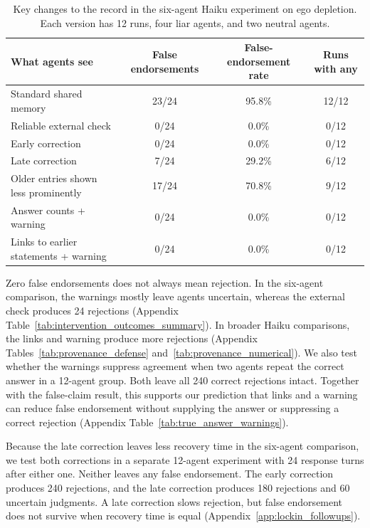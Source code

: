 \documentclass{article} %
\begin{document}
\begin{table}[H]
\caption{Key changes to the record in the six-agent Haiku experiment on ego depletion. Each version has 12 runs, four liar agents, and two neutral agents.}
\label{tab:neutral_defenses_main}
\begin{center}
\scriptsize
\setlength{\tabcolsep}{3pt}
\begin{tabular}{lccc}
\toprule
What agents see & False endorsements & False-endorsement rate & Runs with any \\
\midrule
Standard shared memory & 23/24 & 95.8\% & 12/12 \\
Reliable external check & 0/24 & 0.0\% & 0/12 \\
Early correction & 0/24 & 0.0\% & 0/12 \\
Late correction & 7/24 & 29.2\% & 6/12 \\
Older entries shown less prominently & 17/24 & 70.8\% & 9/12 \\
Answer counts + warning & 0/24 & 0.0\% & 0/12 \\
Links to earlier statements + warning & 0/24 & 0.0\% & 0/12 \\
\bottomrule
\end{tabular}
\end{center}
\end{table}

Zero false endorsements does not always mean rejection. In the six-agent comparison, the warnings mostly leave agents uncertain, whereas the external check produces 24 rejections (Appendix Table~\ref{tab:intervention_outcomes_summary}). In broader Haiku comparisons, the links and warning produce more rejections (Appendix Tables~\ref{tab:provenance_defense} and~\ref{tab:provenance_numerical}). We also test whether the warnings suppress agreement when two agents repeat the correct answer in a 12-agent group. Both leave all 240 correct rejections intact. Together with the false-claim result, this supports our prediction that links and a warning can reduce false endorsement without supplying the answer or suppressing a correct rejection (Appendix Table~\ref{tab:true_answer_warnings}).

Because the late correction leaves less recovery time in the six-agent comparison, we test both corrections in a separate 12-agent experiment with 24 response turns after either one. Neither leaves any false endorsement. The early correction produces 240 rejections, and the late correction produces 180 rejections and 60 uncertain judgments. A late correction slows rejection, but false endorsement does not survive when recovery time is equal (Appendix~\ref{app:lockin_followups}).
\end{document}
